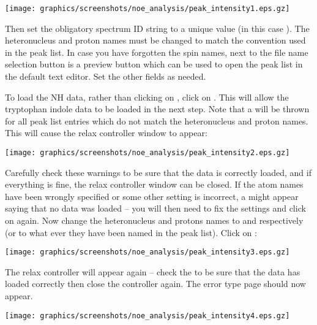 \begin{minipage}[h]{\linewidth}
\centerline{\texttt{[image: graphics/screenshots/noe\_analysis/peak\_intensity1.eps.gz]}}
\end{minipage}

Then set the obligatory spectrum ID string to a unique value (in this case ).  The heteronucleus and proton names must be changed to match the convention used in the peak list.  In case you have forgotten the spin names, next to the file name selection button is a preview button which can be used to open the peak list in the default text editor.  Set the other fields as needed.

To load the NH data, rather than clicking on , click on .  This will allow the tryptophan indole data to be loaded in the next step.  Note that a  will be thrown for all peak list entries which do not match the heteronucleus and proton names.  This will cause the relax controller window to appear:

\begin{minipage}[h]{\linewidth}
\centerline{\texttt{[image: graphics/screenshots/noe\_analysis/peak\_intensity2.eps.gz]}}
\end{minipage}

Carefully check these warnings to be sure that the data is correctly loaded, and if everything is fine, the relax controller window can be closed.  If the atom names have been wrongly specified or some other setting is incorrect, a  might appear saying that no data was loaded -- you will then need to fix the settings and click on  again.  Now change the heteronucleus and protons names to  and  respectively (or to what ever they have been named in the peak list).  Click on :

\begin{minipage}[h]{\linewidth}
\centerline{\texttt{[image: graphics/screenshots/noe\_analysis/peak\_intensity3.eps.gz]}}
\end{minipage}

The relax controller will appear again -- check the  to be sure that the data has loaded correctly then close the controller again.  The error type page should now appear.

\begin{minipage}[h]{\linewidth}
\centerline{\texttt{[image: graphics/screenshots/noe\_analysis/peak\_intensity4.eps.gz]}}
\end{minipage}


